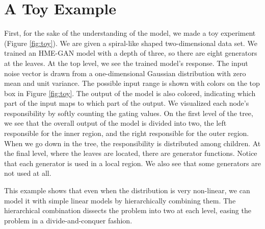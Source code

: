 \documentclass[a4paper,onesided,12pt]{report}
\begin{document}
\section{A Toy Example}
\label{sec:toy}
First, for the sake of the understanding of the model, we made a toy experiment (Figure \ref{fig:toy}). We are given a spiral-like shaped two-dimensional data set. We trained an HME-GAN model with a depth of three, so there are eight generators at the leaves. At the top level, we see the trained model's response. The input noise vector is drawn from a one-dimensional Gaussian distribution with zero mean and unit variance. The possible input range is shown with colors on the top box in Figure \ref{fig:toy}. The output of the model is also colored, indicating which part of the input maps to which part of the output. We visualized each node's responsibility by softly counting the gating values. On the first level of the tree, we see that the overall output of the model is divided into two, the left responsible for the inner region, and the right responsible for the outer region. When we go down in the tree, the responsibility is distributed among children. At the final level, where the leaves are located, there are generator functions. Notice that each generator is used in a local region. We also see that some generators are not used at all.

This example shows that even when the distribution is very non-linear, we can model it with simple linear models by hierarchically combining them. The hierarchical combination dissects the problem into two at each level, easing the problem in a divide-and-conquer fashion.
\end{document}
